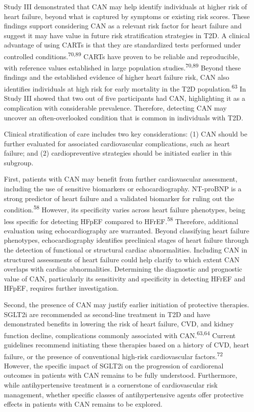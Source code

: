 \documentclass[
  a4paper,
  headsepline=true,
  open=left]{scrbook}
\begin{document}
Study III demonstrated that CAN may help identify individuals at higher
risk of heart failure, beyond what is captured by symptoms or existing
risk scores. These findings support considering CAN as a relevant risk
factor for heart failure and suggest it may have value in future risk
stratification strategies in T2D. A clinical advantage of using CARTs is
that they are standardized tests performed under controlled
conditions.\textsuperscript{70,89} CARTs have proven to be reliable and
reproducible, with reference values established in large population
studies.\textsuperscript{70,89} Beyond these findings and the
established evidence of higher heart failure risk, CAN also identifies
individuals at high risk for early mortality in the T2D
population.\textsuperscript{63} In Study III showed that two out of five
participants had CAN, highlighting it as a complication with
considerable prevalence. Therefore, detecting CAN may uncover an
often-overlooked condition that is common in individuals with T2D.

Clinical stratification of care includes two key considerations: (1) CAN
should be further evaluated for associated cardiovascular complications,
such as heart failure; and (2) cardiopreventive strategies should be
initiated earlier in this subgroup.

First, patients with CAN may benefit from further cardiovascular
assessment, including the use of sensitive biomarkers or
echocardiography. NT-proBNP is a strong predictor of heart failure and a
validated biomarker for ruling out the condition.\textsuperscript{58}
However, its specificity varies across heart failure phenotypes, being
less specific for detecting HFpEF compared to HFrEF.\textsuperscript{58}
Therefore, additional evaluation using echocardiography are warranted.
Beyond classifying heart failure phenotypes, echocardiography identifies
preclinical stages of heart failure through the detection of functional
or structural cardiac abnormalities. Including CAN in structured
assessments of heart failure could help clarify to which extent CAN
overlaps with cardiac abnormalities. Determining the diagnostic and
prognostic value of CAN, particularly its sensitivity and specificity in
detecting HFrEF and HFpEF, requires further investigation.

Second, the presence of CAN may justify earlier initiation of protective
therapies. SGLT2i are recommended as second-line treatment in T2D and
have demonstrated benefits in lowering the risk of heart failure, CVD,
and kidney function decline, complications commonly associated with
CAN.\textsuperscript{63,64} Current guidelines recommend initiating
these therapies based on a history of CVD, heart failure, or the
presence of conventional high-risk cardiovascular
factors.\textsuperscript{72} However, the specific impact of SGLT2i on
the progression of cardiorenal outcomes in patients with CAN remains to
be fully understood. Furthermore, while antihypertensive treatment is a
cornerstone of cardiovascular risk management, whether specific classes
of antihypertensive agents offer protective effects in patients with CAN
remains to be explored.
\end{document}
